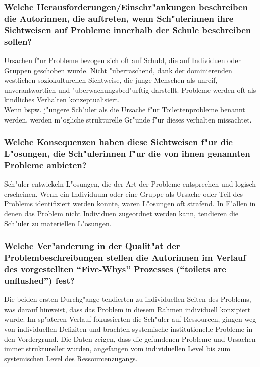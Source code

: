\subsubsection{Welche Herausforderungen/Einschr"ankungen beschreiben die Autorinnen, die auftreten, wenn Sch"ulerinnen ihre Sichtweisen auf Probleme innerhalb der Schule beschreiben sollen?}
Ursachen f"ur Probleme bezogen sich oft auf Schuld, die auf Individuen oder Gruppen geschoben wurde. Nicht "uberraschend, dank der dominierenden westlichen soziokulturellen Sichtweise, die junge Menschen als unreif, unverantwortlich und "uberwachungsbed"urftig darstellt. Probleme werden oft als kindliches Verhalten konzeptualisiert.\\
Wenn bspw. j"ungere Sch"uler als die Ursache f"ur Toilettenprobleme benannt werden, werden m"ogliche strukturelle Gr"unde f"ur dieses verhalten missachtet. 

\subsubsection{Welche Konsequenzen haben diese Sichtweisen f"ur die L"osungen, die Sch"ulerinnen f"ur die von ihnen genannten Probleme anbieten?}
Sch"uler entwickeln L"osungen, die der Art der Probleme entsprechen und logisch erscheinen. Wenn ein Individuum oder eine Gruppe als Ursache oder Teil des Problems identifiziert werden konnte, waren L"osungen oft strafend. In F"allen in denen das Problem nicht Individuen zugeordnet werden kann, tendieren die Sch"uler zu materiellen L"osungen.

\subsubsection{Welche Ver"anderung in der Qualit"at der Problembeschreibungen stellen die Autorinnen im Verlauf des vorgestellten ``Five-Whys'' Prozesses (``toilets are unflushed'') fest?}
Die beiden ersten Durchg"ange tendierten zu individuellen Seiten des Problems, was darauf hinweist, dass das Problem in diesem Rahmen individuell konzipiert wurde.  Im sp"ateren Verlauf fokussierten die Sch"uler auf Ressourcen, gingen weg von individuellen Defiziten und brachten systemische institutionelle Probleme in den Vordergrund. Die Daten zeigen, dass die gefundenen Probleme und Ursachen immer struktureller wurden, angefangen vom individuellen Level bis zum systemischen Level des Ressourcenzugangs. 

